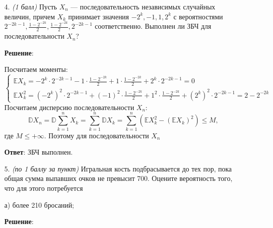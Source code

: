 \documentclass{article}
\begin{document}
\begin{enumerate}
\item[4.] \textit{(1 балл)} Пусть ${X_n}$ — последовательность независимых случайных величин, причем $X_k$ принимает значения $-2^k, -1, 1, 2^k$ с вероятностями $2^{-2k-1},\frac{1-2^{-2k}}{2},\frac{1-2^{-2k}}{2}, 2^{-2k-1}$ соответственно. Выполнен ли ЗБЧ для последовательности ${X_n}$?

\textbf{Решение}:

Посчитаем моменты:
\begin{equation}
  \begin{cases}
    \mathbb{E}X_k = -2^k \cdot 2^{-2k-1} -1 \cdot \frac{1-2^{-2k}}{2} + 1 \cdot \frac{1-2^{-2k}}{2} + 2^k \cdot 2^{-2k-1} = 0 \\
    \mathbb{E}X_k^2 = (-2^k)^2 \cdot 2^{-2k-1} + (-1)^2 \cdot \frac{1-2^{-2k}}{2} + 1^2 \cdot \frac{1-2^{-2k}}{2} + (2^k)^2 \cdot 2^{-2k-1} = 2 - 2^{-2k}
  \end{cases}
\end{equation}
Посчитаем дисперсию последовательности ${X_n}$:
\begin{equation}
  \mathbb{D}X_n = \mathbb{D}\sum_{k=1}^{n}X_k = \sum_{k=1}^{n}\mathbb{D}X_k = \sum_{k=1}^{n}(\mathbb{E}X_k^2 - (\mathbb{E}X_k)^2) \leq M,
\end{equation}
где $M \leq +\infty$. Поэтому для последовательности $X_n$

\textbf{Ответ}:
ЗБЧ выполнен.

\item[5.] \textit{(по 1 баллу за пункт)} Игральная кость подбрасывается до тех пор, пока общая сумма выпавших очков не превысит 700. Оцените вероятность того, что для этого потребуется 

а) более 210 бросаний;

\textbf{Решение}:


\end{enumerate}
\end{document}

